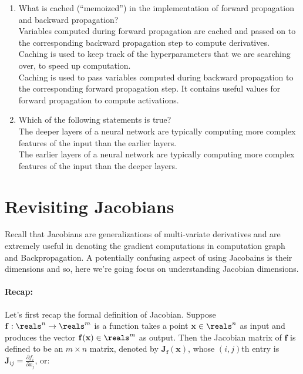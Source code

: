 \begin{enumerate}
        \item What is cached (``memoized'') in the implementation of forward propagation and backward propagation?\\
        \hspace{1cm}\checkedchoice{}  Variables computed during forward propagation are cached and passed on to the corresponding backward propagation step to compute derivatives.\\
        \hspace{1cm}\choice{} Caching is used to keep track of the hyperparameters that we are searching over, to speed up computation.\\
        \hspace{1cm}\choice{} Caching is used to pass variables computed during backward propagation to the corresponding forward propagation step. It contains useful values for forward propagation to compute activations.\\
        \solution{}
    \item Which of the following statements is true?\\
        \hspace{1cm}\checkedchoice{} The deeper layers of a neural network are typically computing more complex features of the input than the earlier layers. \\ 
        \hspace{1cm}\choice{} The earlier layers of a neural network are typically computing more complex features of the input than the deeper layers. \\
        \solution{}
\end{enumerate}

   






\section{Revisiting Jacobians}
Recall that Jacobians are generalizations of multi-variate derivatives and are extremely useful in denoting the gradient computations in computation graph and Backpropagation.
A potentially confusing aspect of using Jacobains is their dimensions and so, here we're going focus on understanding Jacobian dimensions. 


\noindent
\paragraph{Recap:}Let's first recap the formal definition of Jacobian. 
Suppose $\mathbf{f}: \reals^n \rightarrow \reals^m $ is a function takes a point $\mathbf{x} \in \reals^n$  as input and produces the vector $\mathbf{f(x)} \in \reals^m$ as output. 
Then the Jacobian matrix of  $\mathbf{f}$ is defined to be an $m \times n$ matrix, denoted by $\mathbf{J}_\mathbf{f}(\mathbf{x})$, whose $(i, j)$th entry is $\mathbf{J}_{ij} = \frac{\partial f_i}{\partial x_j}$, or: 


